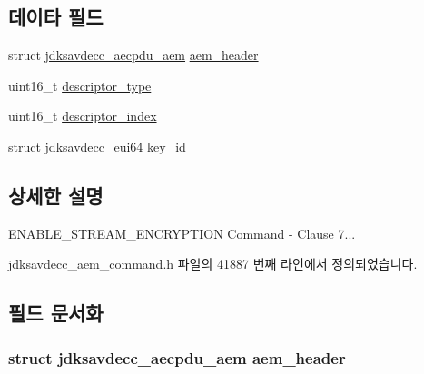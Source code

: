 \subsection*{데이타 필드}
\begin{DoxyCompactItemize}
\item 
struct \hyperlink{structjdksavdecc__aecpdu__aem}{jdksavdecc\+\_\+aecpdu\+\_\+aem} \hyperlink{structjdksavdecc__aem__command__enable__stream__encryption_ae1e77ccb75ff5021ad923221eab38294}{aem\+\_\+header}
\item 
uint16\+\_\+t \hyperlink{structjdksavdecc__aem__command__enable__stream__encryption_ab7c32b6c7131c13d4ea3b7ee2f09b78d}{descriptor\+\_\+type}
\item 
uint16\+\_\+t \hyperlink{structjdksavdecc__aem__command__enable__stream__encryption_a042bbc76d835b82d27c1932431ee38d4}{descriptor\+\_\+index}
\item 
struct \hyperlink{structjdksavdecc__eui64}{jdksavdecc\+\_\+eui64} \hyperlink{structjdksavdecc__aem__command__enable__stream__encryption_a37cbdf6056556ccfaee3ab01dc7c3032}{key\+\_\+id}
\end{DoxyCompactItemize}


\subsection{상세한 설명}
E\+N\+A\+B\+L\+E\+\_\+\+S\+T\+R\+E\+A\+M\+\_\+\+E\+N\+C\+R\+Y\+P\+T\+I\+ON Command -\/ Clause 7... 

jdksavdecc\+\_\+aem\+\_\+command.\+h 파일의 41887 번째 라인에서 정의되었습니다.



\subsection{필드 문서화}
\subsubsection[{\texorpdfstring{aem\+\_\+header}{aem_header}}]{\setlength{\rightskip}{0pt plus 5cm}struct {\bf jdksavdecc\+\_\+aecpdu\+\_\+aem} aem\+\_\+header}\hypertarget{structjdksavdecc__aem__command__enable__stream__encryption_ae1e77ccb75ff5021ad923221eab38294}{}\label{structjdksavdecc__aem__command__enable__stream__encryption_ae1e77ccb75ff5021ad923221eab38294}


